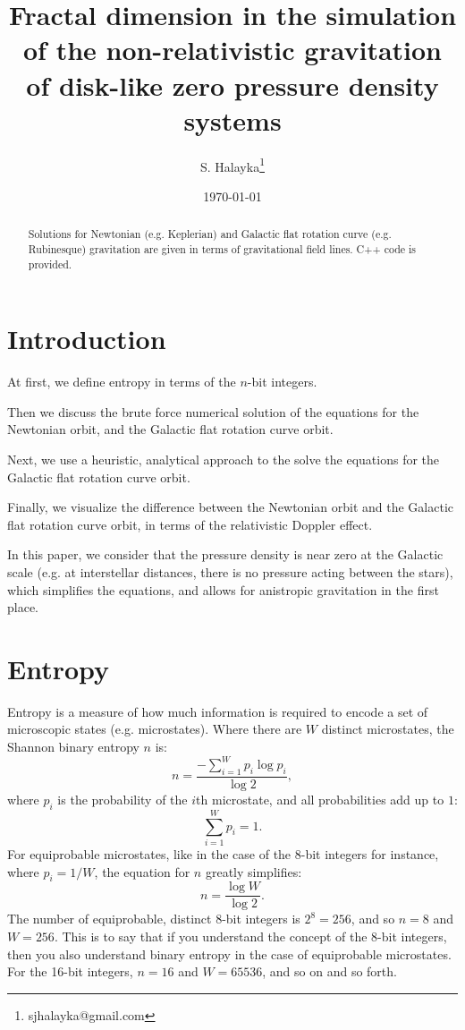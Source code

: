 \documentclass[12pt]{article}
\title{Fractal dimension in the simulation of the non-relativistic gravitation of disk-like zero pressure density systems}
\author{S. Halayka\footnote{sjhalayka@gmail.com}}
\date{\today\;\currenttime}
\begin{document}
 
\maketitle

\begin{abstract}
Solutions for Newtonian (e.g. Keplerian) and Galactic flat rotation curve (e.g. Rubinesque) gravitation are given in terms of gravitational field lines.
C++ code is provided.
\end{abstract}



\section{Introduction}

At first, we define entropy in terms of the $n$-bit integers.

Then we discuss the brute force numerical solution of the equations for the Newtonian orbit, and the Galactic flat rotation curve orbit.

Next, we use a heuristic, analytical approach to the solve the equations for the Galactic flat rotation curve orbit.

Finally, we visualize the difference between the Newtonian orbit and the Galactic flat rotation curve orbit, in terms of the relativistic Doppler effect.

In this paper, we consider that the pressure density is near zero at the Galactic scale (e.g. at interstellar distances, there is no pressure acting between the stars), which simplifies the equations, and allows for anistropic gravitation in the first place.



\section{Entropy}
Entropy is a measure of how much information is required to encode a set of microscopic states (e.g. microstates).
Where there are $W$ distinct microstates, the Shannon binary entropy $n$ is:
\begin{equation}
n =  \frac{-\sum_{i = 1}^{W} p_i \log p_i} {\log 2},
\end{equation}
where $p_i$ is the probability of the $i$th microstate, and all probabilities add up to $1$:
\begin{equation}
\sum_{i = 1}^{W} p_i = 1.
\end{equation}
For equiprobable microstates, like in the case of the 8-bit integers for instance, where $p_i = 1/W$, the equation for $n$ greatly simplifies:
\begin{equation}
n = \frac{\log W}{\log 2}.
\end{equation}
The number of equiprobable, distinct 8-bit integers is $2^8 = 256$, and so $n = 8$ and $W= 256$.
This is to say that if you understand the concept of the 8-bit integers, then you also understand binary entropy in the case of equiprobable microstates.
For the 16-bit integers, $n = 16$ and $W = 65536$, and so on and so forth.
\end{document}
